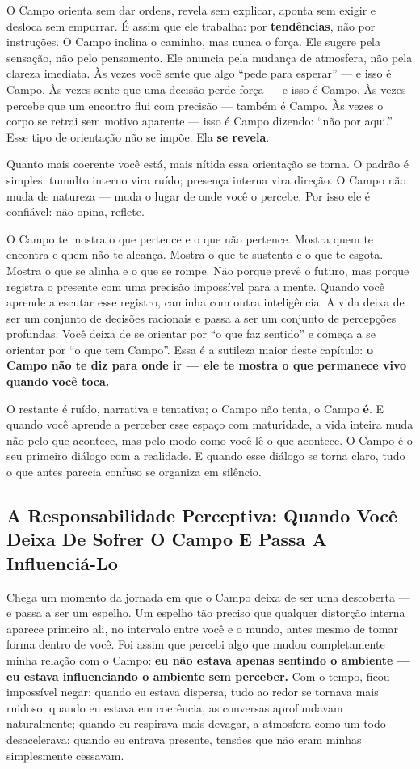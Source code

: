 \documentclass[12pt]{book}
\begin{document}
O Campo orienta sem dar ordens, revela sem explicar, aponta sem exigir e desloca sem empurrar. É assim que ele trabalha: por \textbf{tendências}, não por instruções. O Campo inclina o caminho, mas nunca o força. Ele sugere pela sensação, não pelo pensamento. Ele anuncia pela mudança de atmosfera, não pela clareza imediata. Às vezes você sente que algo \enquote{pede para esperar} --- e isso é Campo. Às vezes sente que uma decisão perde força --- e isso é Campo. Às vezes percebe que um encontro flui com precisão --- também é Campo. Às vezes o corpo se retrai sem motivo aparente --- isso é Campo dizendo: \enquote{não por aqui.} Esse tipo de orientação não se impõe. Ela \textbf{se revela}.

Quanto mais coerente você está, mais nítida essa orientação se torna. O padrão é simples: tumulto interno vira ruído; presença interna vira direção. O Campo não muda de natureza --- muda o lugar de onde você o percebe. Por isso ele é confiável: não opina, reflete.

O Campo te mostra o que pertence e o que não pertence. Mostra quem te encontra e quem não te alcança. Mostra o que te sustenta e o que te esgota. Mostra o que se alinha e o que se rompe. Não porque prevê o futuro, mas porque registra o presente com uma precisão impossível para a mente. Quando você aprende a escutar esse registro, caminha com outra inteligência. A vida deixa de ser um conjunto de decisões racionais e passa a ser um conjunto de percepções profundas. Você deixa de se orientar por \enquote{o que faz sentido} e começa a se orientar por \enquote{o que tem Campo}. Essa é a sutileza maior deste capítulo: \textbf{o Campo não te diz para onde ir --- ele te mostra o que permanece vivo quando você toca.}

O restante é ruído, narrativa e tentativa; o Campo não tenta, o Campo \textbf{é}. E quando você aprende a perceber esse espaço com maturidade, a vida inteira muda não pelo que acontece, mas pelo modo como você lê o que acontece. O Campo é o seu primeiro diálogo com a realidade. E quando esse diálogo se torna claro, tudo o que antes parecia confuso se organiza em silêncio.

\subsection*{A Responsabilidade Perceptiva: Quando Você Deixa De Sofrer O Campo E Passa A Influenciá-Lo}

Chega um momento da jornada em que o Campo deixa de ser uma descoberta --- e passa a ser um espelho. Um espelho tão preciso que qualquer distorção interna aparece primeiro ali, no intervalo entre você e o mundo, antes mesmo de tomar forma dentro de você. Foi assim que percebi algo que mudou completamente minha relação com o Campo: \textbf{eu não estava apenas sentindo o ambiente --- eu estava influenciando o ambiente sem perceber.} Com o tempo, ficou impossível negar: quando eu estava dispersa, tudo ao redor se tornava mais ruidoso; quando eu estava em coerência, as conversas aprofundavam naturalmente; quando eu respirava mais devagar, a atmosfera como um todo desacelerava; quando eu entrava presente, tensões que não eram minhas simplesmente cessavam.
\end{document}
